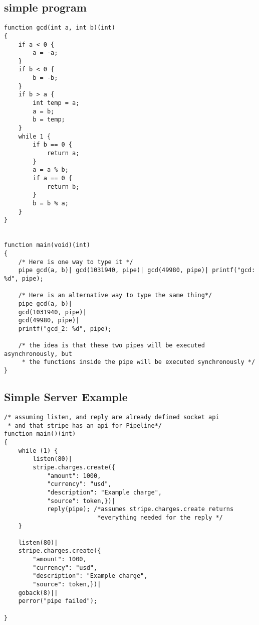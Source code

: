 \documentclass[11pt]{article}
\begin{document}
\subsection{simple program}
\begin{lstlisting}
function gcd(int a, int b)(int)
{
	if a < 0 {
		a = -a;
	}
	if b < 0 {
		b = -b;
	}
	if b > a {
		int temp = a;
		a = b;
		b = temp;
	}
	while 1 {
		if b == 0 {
			return a;
		}
		a = a % b;
		if a == 0 {
			return b;		
		}
		b = b % a;
	}
}


function main(void)(int)
{
	/* Here is one way to type it */
	pipe gcd(a, b)| gcd(1031940, pipe)| gcd(49980, pipe)| printf("gcd: %d", pipe);
	
	/* Here is an alternative way to type the same thing*/
	pipe gcd(a, b)|
	gcd(1031940, pipe)|
	gcd(49980, pipe)|
	printf("gcd_2: %d", pipe);
	
	/* the idea is that these two pipes will be executed asynchronously, but
	 * the functions inside the pipe will be executed synchronously */
}

\end{lstlisting}
\subsection{Simple Server Example}
\begin{lstlisting}
/* assuming listen, and reply are already defined socket api
 * and that stripe has an api for Pipeline*/
function main()(int)
{
	while (1) {
		listen(80)|
		stripe.charges.create({
			"amount": 1000,
			"currency": "usd",
			"description": "Example charge",
			"source": token,})|
			reply(pipe); /*assumes stripe.charges.create returns
			              *everything needed for the reply */
	}
	
	listen(80)|
	stripe.charges.create({
		"amount": 1000,
		"currency": "usd",
		"description": "Example charge",
		"source": token,})|
	goback(8)||
	perror("pipe failed");
	
}	
\end{lstlisting}

\end{document}
